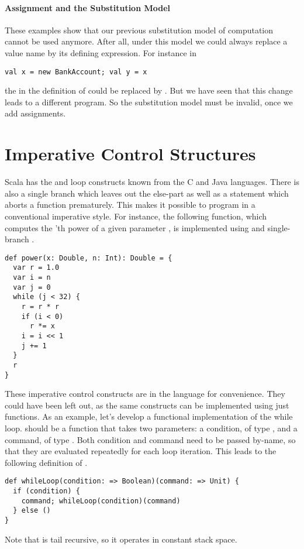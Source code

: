 {\paragraph{Assignment and the Substitution Model}
These examples show that our previous substitution model of
computation cannot be used anymore.  After all, under this
model we could always replace a value name by its
defining expression.
For instance in
\begin{lstlisting}
val x = new BankAccount; val y = x
\end{lstlisting}
the  in the definition of  could
be replaced by .
But we have seen that this change leads to a different program.
So the substitution model must be invalid, once we add assignments. 

\section{Imperative Control Structures}

Scala has the  and  loop constructs known
from the C and Java languages. There is also a single branch 
which leaves out the else-part as well as a  statement which
aborts a function prematurely. This makes it possible to program in a
conventional imperative style. For instance, the following function,
which computes the 'th power of a given parameter , is
implemented using  and single-branch .
\begin{lstlisting}
def power(x: Double, n: Int): Double = {
  var r = 1.0
  var i = n
  var j = 0
  while (j < 32) {
    r = r * r
    if (i < 0)
      r *= x
    i = i << 1
    j += 1
  }
  r
}
\end{lstlisting}
These imperative control constructs are in the language for
convenience. They could have been left out, as the same constructs can
be implemented using just functions. As an example, let's develop a
functional implementation of the while loop.  should
be a function that takes two parameters: a condition, of type
, and a command, of type . Both condition and
command need to be passed by-name, so that they are evaluated
repeatedly for each loop iteration.  This leads to the following
definition of .
\begin{lstlisting}
def whileLoop(condition: => Boolean)(command: => Unit) {
  if (condition) {
    command; whileLoop(condition)(command)
  } else ()
}
\end{lstlisting}
Note that  is tail recursive, so it operates in
constant stack space.

}
